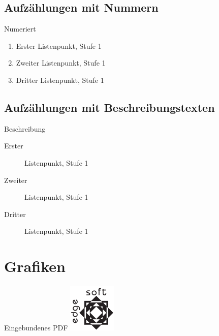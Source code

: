 	\subsection{Aufzählungen mit Nummern}

	\begin{frame}{Numeriert}
		\begin{enumerate}
			\item Erster Listenpunkt, Stufe 1
			\item Zweiter Listenpunkt, Stufe 1
			\item Dritter Listenpunkt, Stufe 1
		\end{enumerate}
	\end{frame}


	\subsection{Aufzählungen mit Beschreibungstexten}

	\begin{frame}{Beschreibung}
		\begin{description}
			\item[Erster] Listenpunkt, Stufe 1
			\item[Zweiter] Listenpunkt, Stufe 1
			\item[Dritter] Listenpunkt, Stufe 1
		\end{description}
	\end{frame}


	\section{Grafiken}

	\begin{frame}{Eingebundenes PDF}
		\includegraphics{testlogo}
	\end{frame}


